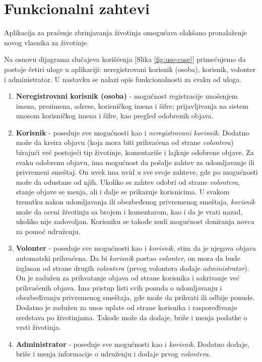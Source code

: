 \documentclass[a4paper]{article}
\begin{document}
    
    

    \section{Funkcionalni zahtevi}
    \par Aplikacija za praćenje zbrinjavanja životinja omogućava olakšano pronalaženje novog vlasnika za životinje. 
    \par Na osnovu dijagrama slučajeva korišćenja [Slika \ref{fig:use-case}] primećujemo da postoje četiri uloge u aplikaciji: neregistrovani korisnik (osoba), korisnik, volonter i administrator. U nastavku se nalazi 
    opis funkcionalnosti za svaku od uloga.
    \begin{enumerate}
        \item \textbf{Neregistrovani korisnik (osoba)} - mogućnost registracije unošenjem imena, prezimena, adrese, korisničkog imena i šifre;
        prijavljivanja na sistem unosom korisničkog imena i šifre, kao pregled odobrenih objava.
        \item \textbf{Korisnik} - poseduje sve mogućnosti kao i \textit{neregistrovani korisnik}. Dodatno može da kreira objavu (koja mora biti prihvaćena od strane
        \textit{volontera}) birajući već postojeći tip životinje, komentariše i lajkuje odobrene objave. Za svaku odobrenu objavu, ima mogućnost da pošalje zahtev za udomljavanje ili 
        privremeni smeštaj. On uvek ima uvid u sve svoje zahteve, gde po mogućnosti može da odustane od njih. Ukoliko se zahtev odobri od strane \textit{volontera}, stanje objave se menja, 
        ali i dalje se prikazuje korisnicima. U svakom trenutku nakon udomljavanja ili obezbeđenog privremenog smeštaja, \textit{korisnik} može da oceni životinju sa brojem i komentarom, 
        kao i da je vrati nazad, ukoliko nije zadovoljan. Korisniku se takođe nudi mogućnost doniranja novca za pomoć udruženju.
        \item \textbf{Volonter} - poseduje sve mogućnosti kao i \textit{korisnik}, stim da je njegova objava automatski prihvaćena. Da bi \textit{korisnik} postao \textit{volonter}, on mora
        da bude izglasan od strane drugih \textit{volontera} (prvog volontera dodaje \textit{administrator}). On je zadužen za prihvatanje objava od strane korisnika i sakrivanje već 
        prihvaćenih objava. Ima pristup listi svih ponuda o udomljavanju i obezbeđivanju privremenog smeštaja, gde može da prihvati ili odbije ponude. Dodatno je zadužen za unos uplate od 
        strane korisnika i raspoređivanje sredstava po životinjama. Takođe može da dodaje, briše i menja podatke o vrsti životinja. 
        \item \textbf{Administrator} - poseduje sve mogućnosti kao i \textit{korisnik}. Dodatno dodaje, briše i menja informacije o udruženju i dodaje prvog \textit{volontera}.
    \end{enumerate} 
\end{document}
